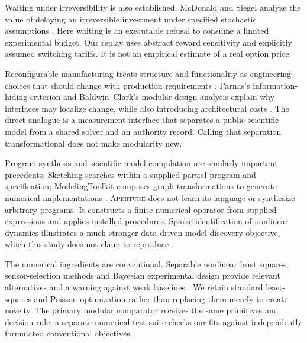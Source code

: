 \documentclass[11pt,letterpaper]{article}
\newcommand{\ap}{\textsc{Aperture}}
\begin{document}
Waiting under irreversibility is also established. McDonald and Siegel analyze the value of delaying an irreversible investment under specified stochastic assumptions \citep{mcdonald1986waiting}. Here waiting is an executable refusal to consume a limited experimental budget. Our replay uses abstract reward sensitivity and explicitly assumed switching tariffs. It is not an empirical estimate of a real option price.

Reconfigurable manufacturing treats structure and functionality as engineering choices that should change with production requirements \citep{koren1999reconfigurable}. Parnas's information-hiding criterion and Baldwin--Clark's modular design analysis explain why interfaces may localize change, while also introducing architectural costs \citep{parnas1972modules,baldwin2002option}. The direct analogue is a measurement interface that separates a public scientific model from a shared solver and an authority record. Calling that separation transformational does not make modularity new.

Program synthesis and scientific model compilation are similarly important precedents. Sketching searches within a supplied partial program and specification; ModelingToolkit composes graph transformations to generate numerical implementations \citep{solarlezama2008sketching,ma2021modelingtoolkit}. \ap{} does not learn its language or synthesize arbitrary programs. It constructs a finite numerical operator from supplied expressions and applies installed procedures. Sparse identification of nonlinear dynamics illustrates a much stronger data-driven model-discovery objective, which this study does not claim to reproduce \citep{brunton2016sindy}.

The numerical ingredients are conventional. Separable nonlinear least squares, sensor-selection methods and Bayesian experimental design provide relevant alternatives and a warning against weak baselines \citep{golub1973separable,joshi2009sensors,foster2019design}. We retain standard least-squares and Poisson optimization rather than replacing them merely to create novelty. The primary modular comparator receives the same primitives and decision rule; a separate numerical test suite checks our fits against independently formulated conventional objectives.
\end{document}
